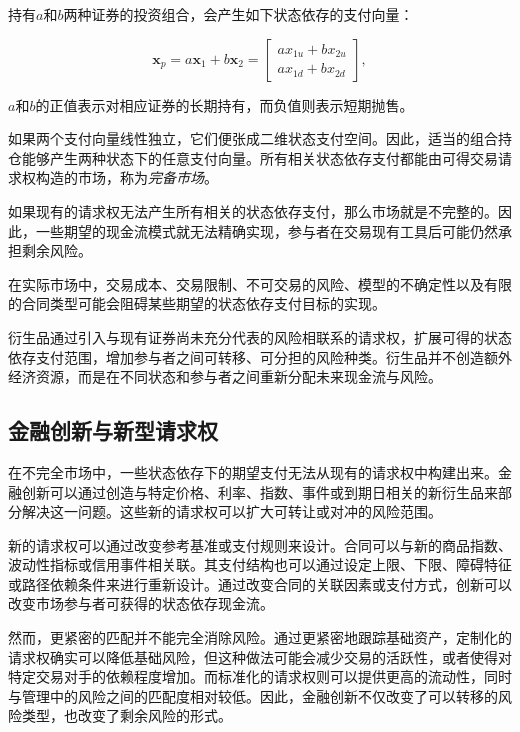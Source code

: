持有$a$和$b$两种证券的投资组合，会产生如下状态依存的支付向量：

\begin{equation}
\mathbf{x}_p
=
a\mathbf{x}_1+b\mathbf{x}_2
=
\begin{bmatrix}
ax_{1u}+bx_{2u}\\
ax_{1d}+bx_{2d}
\end{bmatrix},
\label{eq:ch11-spanning-portfolio}
\end{equation}

$a$和$b$的正值表示对相应证券的长期持有，而负值则表示短期抛售。

如果两个支付向量线性独立，它们便张成二维状态支付空间。因此，适当的组合持仓能够产生两种状态下的任意支付向量。所有相关状态依存支付都能由可得交易请求权构造的市场，称为\emph{完备市场}。

如果现有的请求权无法产生所有相关的状态依存支付，那么市场就是不完整的。因此，一些期望的现金流模式就无法精确实现，参与者在交易现有工具后可能仍然承担剩余风险。

在实际市场中，交易成本、交易限制、不可交易的风险、模型的不确定性以及有限的合同类型可能会阻碍某些期望的状态依存支付目标的实现。

衍生品通过引入与现有证券尚未充分代表的风险相联系的请求权，扩展可得的状态依存支付范围，增加参与者之间可转移、可分担的风险种类。衍生品并不创造额外经济资源，而是在不同状态和参与者之间重新分配未来现金流与风险。

\subsection{金融创新与新型请求权}

在不完全市场中，一些状态依存下的期望支付无法从现有的请求权中构建出来。金融创新可以通过创造与特定价格、利率、指数、事件或到期日相关的新衍生品来部分解决这一问题。这些新的请求权可以扩大可转让或对冲的风险范围。

新的请求权可以通过改变参考基准或支付规则来设计。合同可以与新的商品指数、波动性指标或信用事件相关联。其支付结构也可以通过设定上限、下限、障碍特征或路径依赖条件来进行重新设计。通过改变合同的关联因素或支付方式，创新可以改变市场参与者可获得的状态依存现金流。

然而，更紧密的匹配并不能完全消除风险。通过更紧密地跟踪基础资产，定制化的请求权确实可以降低基础风险，但这种做法可能会减少交易的活跃性，或者使得对特定交易对手的依赖程度增加。而标准化的请求权则可以提供更高的流动性，同时与管理中的风险之间的匹配度相对较低。因此，金融创新不仅改变了可以转移的风险类型，也改变了剩余风险的形式。

